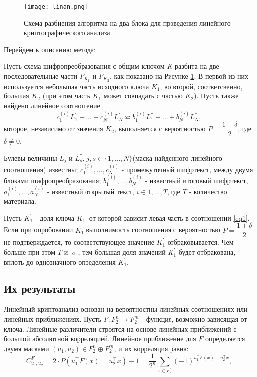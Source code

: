 \documentclass[utf8x, 14pt]{G7-32} %
\begin{document}
\begin{figure}[h!]
	\centering
	\texttt{[image: linan.png]}
	\caption{Схема разбиения алгоритма на два блока для проведения линейного криптографического анализа}
	\label{fig:linan}
\end{figure}

Перейдем к описанию метода:

Пусть схема шифропреобразования с общим ключом $K$ разбита на две последовательные части $F_{K_1}$ и $F_{K_2}$, как показано на Рисунке \ref{fig:linan}. В первой из них используется небольшая часть исходного ключа $K_1$, во второй, соответсвенно, большая $K_2$ (при этом часть $K_1$ может совпадать с частью $K_2$). Пусть также найдено линейное соотношение 
$$c_1^{(i)} L_1^{'} + ... + c_N^{(i)} L_N^{'} \backsimeq b_1^{(i)} L_1^{''} + ... + b_N^{(i)} L_N^{''} , $$ \label{eq1}
 которое, независимо от значения $K_2$, выполняется с вероятностью $P = \dfrac{1+\delta}{2}$, где $\delta \neq 0$.

Булевы величины $L_j^{'}$ и $L_s^{''}$, $j,s \in \{1,...,N\}$(маска найденного линейного соотношения) известны; $c_1^{(i)}, ..., c_N^{(i)}$  - промежуточный шифртекст, между двумя блоками шифропреобрахования; $b_1^{(i)}, ..., b_N^{(i)}$ - известный итоговый шифртекст, $a_1^{(i)}, ..., a_N^{(i)}$ - известный открытый текст, $i \in {1, ..., T}$, где $T$ - количество материала.

Пусть $K_1^{'}$ - доля ключа $K_1$, от которой зависит левая часть в соотношении \ref{eq1}. Если при опробовании $K_1^{'}$ выполнимость соотношения с вероятностью $P = \dfrac{1+\delta}{2}$ не подтверждается, то соответствующее значение $K_1^{'}$ отбраковывается. Чем больше при этом $T$ и $|\sigma|$, тем большая доля значений $K_1^{'}$ будет отбракована, вплоть до однозначного определения $K_1^{'}$.


\subsection{Их результаты}
Линейный криптоанализ основан на вероятностны линейных соотношениях или линейных приближениях. Пусть $F: F_2^n \to F_2^m$ - функция, возможно зависящая от ключа. Линейные различители строятся на основе линейных приближений с большой абсолютной корреляцией. Линейное приближение для $F$ определяется двумя масками $(u_1,u_2) \in F_2^n \oplus F_2^m$, и их корреляция равна:
$$ C_{u_1,u_2}^F = 2\cdot P\left(u_1^\top F(x) = u_2^\top x\right)-1 = \dfrac{1}{2^n} \sum_{x\in F_2^n} (-1)^{u_1^\top F(x) + u_2^\top x},$$
\end{document}
